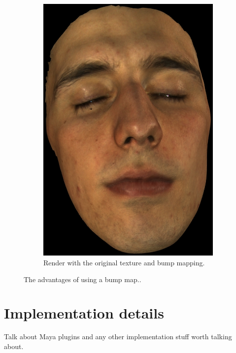 \documentclass[11pt]{report}
\begin{document}
\begin{figure}
\begin{subfigure}[t]{0.48\textwidth}
                \includegraphics[width=\textwidth]{img/richard_disp_impr}
                \caption{Render with the original texture and bump mapping.}
                \label{fig:richard_disp_impr}
        \end{subfigure}
        \caption{The advantages of using a bump map..}
        \label{fig:bump_mapping_richard}
\end{figure}

\chapter{Implementation details}
\label{sec:implementation_details}

Talk about Maya plugins and any other implementation stuff worth talking about. 
\end{document}
